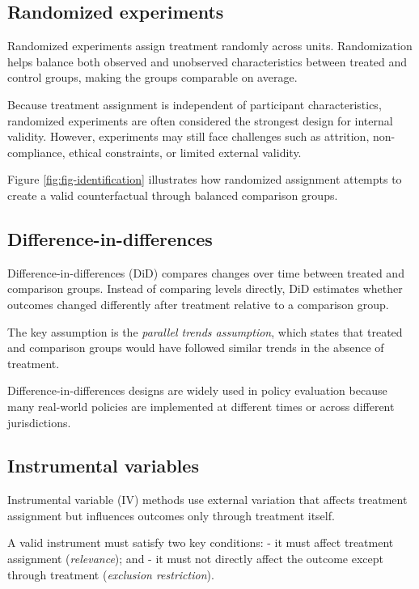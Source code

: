 \documentclass[
  11pt,
  oneside]{book}
\begin{document}
\subsection{Randomized experiments}\label{randomized-experiments}

Randomized experiments assign treatment randomly across units. Randomization helps balance both observed and unobserved characteristics between treated and control groups, making the groups comparable on average.

Because treatment assignment is independent of participant characteristics, randomized experiments are often considered the strongest design for internal validity. However, experiments may still face challenges such as attrition, non-compliance, ethical constraints, or limited external validity.

Figure \ref{fig:fig-identification} illustrates how randomized assignment attempts to create a valid counterfactual through balanced comparison groups.

\subsection{Difference-in-differences}\label{difference-in-differences}

Difference-in-differences (DiD) compares changes over time between treated and comparison groups. Instead of comparing levels directly, DiD estimates whether outcomes changed differently after treatment relative to a comparison group.

The key assumption is the \emph{parallel trends assumption}, which states that treated and comparison groups would have followed similar trends in the absence of treatment.

Difference-in-differences designs are widely used in policy evaluation because many real-world policies are implemented at different times or across different jurisdictions.

\subsection{Instrumental variables}\label{instrumental-variables}

Instrumental variable (IV) methods use external variation that affects treatment assignment but influences outcomes only through treatment itself.

A valid instrument must satisfy two key conditions:
- it must affect treatment assignment (\emph{relevance}); and
- it must not directly affect the outcome except through treatment (\emph{exclusion restriction}).
\end{document}

